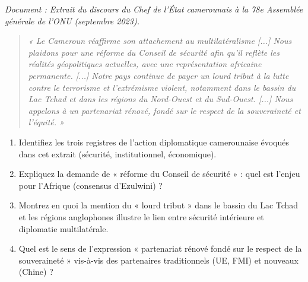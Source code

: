 \documentclass[11pt]{article}
\newcommand{\cle}[1]{{\popxbold\color{popdark}#1}}
\newcounter{popsec}
\newcounter{popsub}
\newcommand{\courssub}[1]{%
  \stepcounter{popsub}%
  \par\vspace{9pt}\noindent{\popxbold\fontsize{11.5}{13}\selectfont\color{popink}{\color{poporange}\thepopsec.\thepopsub}\hspace{6pt}#1}\par\nopagebreak\vspace{4pt}
}
\begin{document}
\courssub{Je m'entraîne}

\begin{exercice}
\emph{Document : Extrait du discours du Chef de l'État camerounais à la 78e Assemblée générale de l'ONU (septembre 2023).}
\begin{quote}
\emph{« Le Cameroun réaffirme son attachement au multilatéralisme [...] Nous plaidons pour une réforme du Conseil de sécurité afin qu'il reflète les réalités géopolitiques actuelles, avec une représentation africaine permanente. [...] Notre pays continue de payer un lourd tribut à la lutte contre le terrorisme et l'extrémisme violent, notamment dans le bassin du Lac Tchad et dans les régions du Nord-Ouest et du Sud-Ouest. [...] Nous appelons à un partenariat rénové, fondé sur le respect de la souveraineté et l'équité. »}
\end{quote}
\begin{enumerate}
    \item Identifiez les trois registres de l'action diplomatique camerounaise évoqués dans cet extrait (sécurité, institutionnel, économique).
    \item Expliquez la demande de « réforme du Conseil de sécurité » : quel est l'enjeu pour l'Afrique (consensus d'Ezulwini) ?
    \item Montrez en quoi la mention du « lourd tribut » dans le bassin du Lac Tchad et les régions anglophones illustre le lien entre \cle{sécurité intérieure} et \cle{diplomatie multilatérale}.
    \item Quel est le sens de l'expression « partenariat rénové fondé sur le respect de la souveraineté » vis-à-vis des partenaires traditionnels (UE, FMI) et nouveaux (Chine) ?
\end{enumerate}
\end{exercice}
\end{document}
